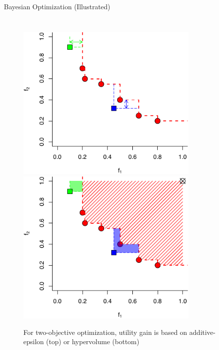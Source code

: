 \begin{frame}{Bayesian Optimization (Illustrated)}
\begin{columns}
    \pause
    \begin{figure}
      \centering
      \includegraphics[width=0.8\textwidth]{figures/serving-bo-2d-1.pdf} \\
      \includegraphics[width=0.8\textwidth]{figures/serving-bo-2d-2.pdf}
      \caption{For two-objective optimization, utility gain is based on
        additive-epsilon (top) or hypervolume (bottom)~\cite{binoisgpareto}}
    \end{figure}
  \end{columns}
\end{frame}

